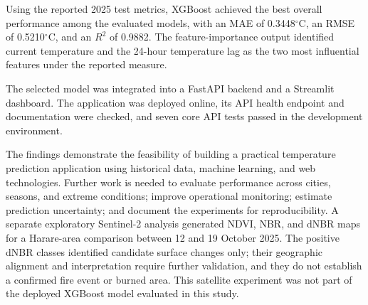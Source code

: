 \documentclass[12pt,a4paper]{article}
\begin{document}
	Using the reported 2025 test metrics, XGBoost achieved the best
	overall performance among the evaluated models, with an MAE of
	0.3448$^\circ$C, an RMSE of 0.5210$^\circ$C, and an $R^2$ of 0.9882.
	The feature-importance output identified current temperature and
	the 24-hour temperature lag as the two most influential features
	under the reported measure.
	
	The selected model was integrated into a FastAPI backend and a
	Streamlit dashboard. The application was deployed online, its API
	health endpoint and documentation were checked, and seven core API
	tests passed in the development environment.
	
	The findings demonstrate the feasibility of building a practical
	temperature prediction application using historical data,
	machine learning, and web technologies. Further work is needed to
	evaluate performance across cities, seasons, and extreme conditions;
	improve operational monitoring; estimate prediction uncertainty;
	and document the experiments for reproducibility. A separate
	exploratory Sentinel-2 analysis generated NDVI, NBR, and dNBR maps
	for a Harare-area comparison between 12 and 19 October 2025. The
	positive dNBR classes identified candidate surface changes only;
	their geographic alignment and interpretation require further
	validation, and they do not establish a confirmed fire event or
	burned area. This satellite experiment was not part of the deployed
	XGBoost model evaluated in this study.
	
\end{document}
